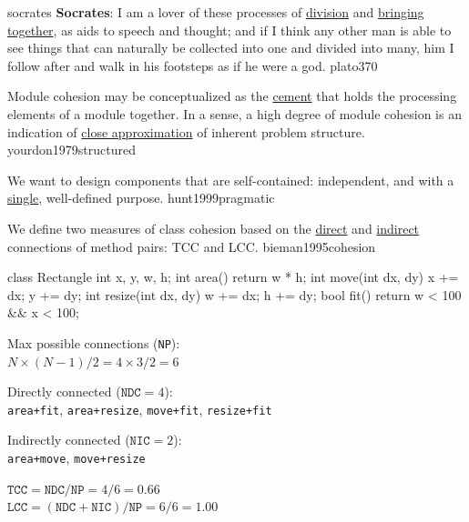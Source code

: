 \documentclass{article}
\begin{document}

\lnQuote
  {socrates}
  {\textbf{Socrates}: I am a lover of these processes of \ul{division} and \ul{bringing together}, as aids to speech and thought; and if I think any other man is able to see things that can naturally be collected into one and divided into many, him I follow after and walk in his footsteps as if he were a god.}
  {plato370}

  {Module cohesion may be conceptualized as the \ul{cement} that holds the processing elements of a module together. In a sense, a high degree of module cohesion is an indication of \ul{close approximation} of inherent problem structure.}
  {yourdon1979structured}

  {We want to design components that are self-contained: independent, and with a \ul{single}, well-defined purpose.}
  {hunt1999pragmatic}

  {We define two measures of class cohesion based on the \ul{direct} and \ul{indirect} connections of method pairs: TCC and LCC.}
  {bieman1995cohesion}

\begin{multicols}{2}
{\small\begin{ffcode}
class Rectangle
  int x, y, w, h;
  int area()
    return w * h;
  int move(int dx, dy)
    x += dx; y += dy;
  int resize(int dx, dy)
    w += dx; h += dy;
  bool fit()
    return w < 100
      && x < 100;
\end{ffcode}
}
\par\columnbreak\par
Max possible connections (\texttt{NP}): \\
\( N \times (N-1) / 2 = 4 \times 3 / 2 = 6\)
\par
Directly connected (\(\texttt{NDC}=4\)): \\
\texttt{area+fit}, \texttt{area+resize}, \texttt{move+fit}, \texttt{resize+fit}
\par
Indirectly connected (\(\texttt{NIC}=2\)): \\
\texttt{area+move}, \texttt{move+resize}
\par
\(\texttt{TCC} = \texttt{NDC} / \texttt{NP} = 4/6 = 0.66 \) \\
\(\texttt{LCC} = (\texttt{NDC} + \texttt{NIC}) / \texttt{NP} = 6/6 = 1.00 \) \\
\end{multicols}
\plush{}
\end{document}
